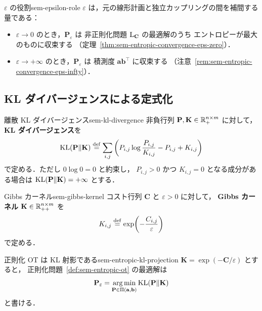 \begin{remark}{$\varepsilon$ の役割}{sem-epsilon-role}
  $\varepsilon$ は，元の線形計画と独立カップリングの間を補間する量である：
  \begin{itemize}
    \item $\varepsilon \to 0$ のとき，$\mathbf{P}_\varepsilon$ は
      非正則化問題 $\mathrm{L}_{\mathbf{C}}$ の最適解のうち
      エントロピーが最大のものに収束する
      （定理~\ref{thm:sem-entropic-convergence-eps-zero}）．
    \item $\varepsilon \to +\infty$ のとき，$\mathbf{P}_\varepsilon$ は
      積測度 $\mathbf{a} \mathbf{b}^\top$ に収束する
      （注意~\ref{rem:sem-entropic-convergence-eps-infty}）．
  \end{itemize}
\end{remark}

\subsection{KL ダイバージェンスによる定式化}
\label{subsec:sem-kl-formulation}

\begin{definition}{離散 KL ダイバージェンス}{sem-kl-divergence}
  非負行列 $\mathbf{P}, \mathbf{K} \in \mathbb{R}_+^{n \times m}$ に対して，
  \textbf{KL ダイバージェンス}を
  \[
    \mathrm{KL}(\mathbf{P} \| \mathbf{K})
    \overset{\mathrm{def}}{=}
    \sum_{i,j}
    \left(
      P_{i,j}\log\frac{P_{i,j}}{K_{i,j}}
      - P_{i,j} + K_{i,j}
    \right)
  \]
  で定める．ただし $0\log 0 = 0$ と約束し，
  $P_{i,j} > 0$ かつ $K_{i,j}=0$ となる成分がある場合は
  $\mathrm{KL}(\mathbf{P}\|\mathbf{K}) = +\infty$ とする．
\end{definition}

\begin{definition}{Gibbs カーネル}{sem-gibbs-kernel}
  コスト行列 $\mathbf{C}$ と $\varepsilon > 0$ に対して，
  \textbf{Gibbs カーネル} $\mathbf{K} \in \mathbb{R}_{++}^{n \times m}$ を
  \[
    K_{i,j} \overset{\mathrm{def}}{=} \exp\!\left(-\frac{C_{i,j}}{\varepsilon}\right)
  \]
  で定める．
\end{definition}

\begin{proposition}{正則化 OT は KL 射影である}{sem-entropic-kl-projection}
  $\mathbf{K} = \exp(-\mathbf{C}/\varepsilon)$ とすると，
  正則化問題~\ref{def:sem-entropic-ot} の最適解は
  \[
    \mathbf{P}_\varepsilon
    =
    \operatorname*{arg\,min}_{\mathbf{P} \in \Pi(\mathbf{a}, \mathbf{b})}
    \mathrm{KL}(\mathbf{P}\|\mathbf{K})
  \]
  と書ける．
\end{proposition}

